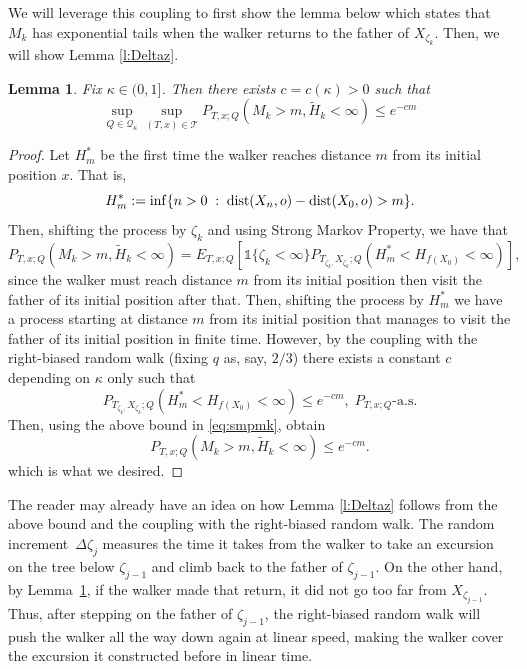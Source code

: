 \documentclass[a4paper]{amsart}
\newtheorem{lemma}{Lemma}
\newcommand{\hitfetak}{\widetilde{H}}
\newcommand{\D}[1]{{\rm dist}(X_{#1},o)}
\begin{document}
We will leverage this coupling to first show the lemma below which states that $M_k$ has exponential tails when the walker returns to the father of $X_{\zeta_k}$. Then, we will show Lemma \ref{l:Deltaz}.
\begin{lemma}\label{l:Mk} Fix $\kappa \in (0,1]$. Then there exists $c = c(\kappa)>0$ such that
    $$
    \sup_{Q \in \mathcal{Q}_\kappa}\sup_{(T,x) \in \mathcal{T}}P_{T,x;Q}(M_k > m, \hitfetak_k < \infty) \le e^{-cm}
    $$
\end{lemma}
\begin{proof}Let $H^*_{m}$ be the first time the walker reaches distance $m$ from its initial position $x$. That is,
\begin{equation}
    H^*_{m} := \inf \{ n > 0 \; :\; \D{n} - \D{0} > m\}.
\end{equation}
    Then, shifting the process by $\zeta_k$ and using Strong Markov Property, we have that 
    \begin{equation}\label{eq:smpmk}
        P_{T,x;Q}(M_k > m, \hitfetak_k <\infty) = E_{T,x;Q}\left[ \mathds{1}\{\zeta_k < \infty\}P_{T_{\zeta_k,}X_{\zeta_k};Q}\left( H^*_m < H_{f(X_0)} < \infty \right)\right],
    \end{equation}
    since the walker must reach distance $m$ from its initial position then visit the father of its initial position after that. Then, shifting the process by $H^*_m$ we have a process starting at distance $m$ from its initial position that manages to visit the father of its initial position in finite time. However, by the coupling with the right-biased random walk (fixing $q$ as, say, $2/3$) there exists a constant $c$ depending on $\kappa$ only such that 
    \begin{equation*}
        P_{T_{\zeta_k,}X_{\zeta_k};Q}\left( H^*_m < H_{f(X_0)} < \infty \right) \le e^{-cm}, \; P_{T,x;Q}\text{-a.s.}
    \end{equation*}
    Then, using the above bound in \eqref{eq:smpmk}, obtain
    $$
    P_{T,x;Q}(M_k > m, \hitfetak_k <\infty) \le e^{-cm}.
    $$
    which is what we desired.
\end{proof}
The reader may already have an idea on how Lemma \ref{l:Deltaz} follows from the above bound and the coupling with the right-biased random walk. The random increment~$\Delta \zeta_j$ measures the time it takes from the walker to take an excursion on the tree below $\zeta_{j-1}$ and climb back to the father of $\zeta_{j-1}$. On the other hand, by Lemma~\ref{l:Mk}, if the walker made that return, it did not go too far from $X_{\zeta_{j-1}}$. Thus, after stepping on the father of $\zeta_{j-1}$, the right-biased random walk will push the walker all the way down again at linear speed, making the walker cover the excursion it constructed before in linear time.
\end{document}
